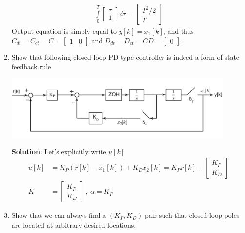 \documentclass[twoside]{article}
\begin{document}
\begin{enumerate}
\begin{align*}
 \int\limits_{0}^{T}  \begin{bmatrix} \tau \\ 1 \end{bmatrix}  d\tau = 
 \begin{bmatrix} T^2/2 \\ T \end{bmatrix} 
\end{align*}
%
Output equation is simply equal to $y[k] = x_1[k]$, and thus $C_{dt} = C_{ct} = C = \begin{bmatrix} 1 & 0 \end{bmatrix} $
and $D_{dt} = D_{ct} = CD= \begin{bmatrix} 0 \end{bmatrix} $.

\item Show that following closed-loop PD type controller is indeed a form of state-feedback rule
		
\begin{center}
  \begin{minipage}[h]{0.9\linewidth}
    \begin{center}
      \includegraphics[width=0.9\textwidth]{block_PD}
    \end{center}
  \end{minipage}
    \end{center}
		
\textbf{Solution:} Let's explicitly write $u[k]$
%
\begin{align*}
u[k] &= K_P (r[k] - x_1[k]) + K_D x_2[k] = K_P r[k] - \begin{bmatrix} K_P \\ K_D \end{bmatrix} \\
K &= \begin{bmatrix} K_P \\ K_D \end{bmatrix} \ , \ \alpha = K_P
\end{align*}
%
\item Show that we can always find a $(K_P,K_D)$ pair such that closed-loop poles are located
at arbitrary desired locations. 


\end{enumerate}
\end{document}
